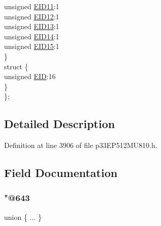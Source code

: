 \begin{DoxyCompactItemize}
\begin{tabbing}
\>\>unsigned \hyperlink{structtag_c1_r_x_f3_e_i_d_b_i_t_s_a710bdb0d602deb021b0be99066008018}{EID11}:1\\
\>\>unsigned \hyperlink{structtag_c1_r_x_f3_e_i_d_b_i_t_s_aa347bb85867bd8d4e0124f7cff8c6472}{EID12}:1\\
\>\>unsigned \hyperlink{structtag_c1_r_x_f3_e_i_d_b_i_t_s_a37d5f3edcbf6ef62f848fd4f3c584f79}{EID13}:1\\
\>\>unsigned \hyperlink{structtag_c1_r_x_f3_e_i_d_b_i_t_s_a7ffc0b0e0d99b8476b6f9a45337c17ab}{EID14}:1\\
\>\>unsigned \hyperlink{structtag_c1_r_x_f3_e_i_d_b_i_t_s_a293cd7dc1746257fa75a60cbd9383cd7}{EID15}:1\\
\>\} \\
\>struct \{\\
\>\>unsigned \hyperlink{structtag_c1_r_x_f3_e_i_d_b_i_t_s_ae80b378c9141f7c03e0b4e55b5f4b54d}{EID}:16\\
\>\} \\
\}; \\

\end{tabbing}\end{DoxyCompactItemize}


\subsection{Detailed Description}


Definition at line 3906 of file p33\+E\+P512\+M\+U810.\+h.



\subsection{Field Documentation}
\mbox{\label{structtag_c1_r_x_f3_e_i_d_b_i_t_s_aadc324ad3ee9c76af19832b18cdff52b}} 
\subsubsection{\texorpdfstring{"@643}{@643}}
{\footnotesize\ttfamily union \{ ... \} }

\mbox{\label{structtag_c1_r_x_f3_e_i_d_b_i_t_s_ae80b378c9141f7c03e0b4e55b5f4b54d}} 
